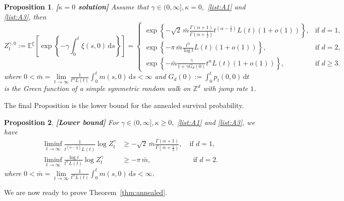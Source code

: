 \documentclass{article}[12pt]
\newtheorem{proposition}{Proposition}[section]
\theoremstyle{definition}
\newcommand{\Z}{\mathbb{Z}}
\newcommand{\E}{\mathbb{E}}
\newcommand{\1}{\mathbbm{1}}
\newcommand{\dd }{\mathrm{d} }
\begin{document}
\begin{proposition}
 \label{lm:kappa0}{\em \bf[$\kappa = 0$ solution]}
Assume that $\gamma \in (0,\infty],\kappa = 0,$ {\rm \ref{list:A1}} and {\rm \ref{list:A3}}, then
    \begin{equation}
      Z^{\gamma,0}_{t}:=  \E^\xi \left[\exp\left\{-\gamma\int_0^t \xi(s,0) \, \dd s\right\}\right] = \begin{cases}
            \exp\left\{- \sqrt{2}\, \bar{m} \frac{\Gamma(\alpha+1)}{\Gamma(\alpha+\frac{1}{2}
        )}t^{(\alpha-\frac{1}{2})}L(t)(1+o(1))\right\},& \text{if } d=1,\\
        \exp\left\{- {\pi\,\bar{m}}\frac{t^{\alpha}}{\log t}L(t)(1+o(1))\right\}, & \text{if } d=2,\\
      \exp\left\{-{\bar{m}}\frac{\gamma }{1 + \gamma G_d(0)}t^{\alpha}L(t)(1+o(1))\right\}, & \text{if } d\ge 3.
        \end{cases}
        \label{eqn:kappazerofinal}
    \end{equation}
    where  $0<\bar{m} = \lim\limits_{t\to \infty}\frac{1}{t^\alpha L(t)}\int_0^t m(s,0)\, \dd s< \infty$ and
 $G_d(0):= \int_0^t p_t(0,0)\,\dd t$ is the Green function of a simple symmetric random walk on $\Z^d$ with jump rate $1$. 
\end{proposition}
The final Proposition is the lower bound for the annealed survival probability. 
\begin{proposition}\label{prop:LB}{\em \bf[Lower bound]}
   For $\gamma \in (0,\infty],\kappa \ge 0,$ {\rm \ref{list:A1}} and {\rm\ref{list:A3}}, we have 
    \begin{equation}
    \begin{split}
       \liminf_{t\to \infty}\frac{1}{t^{(\alpha-\frac{1}{2})}L(t)} \log Z^{\gamma}_t &\ge  - \sqrt{2}\, \bar{m} \frac{\Gamma(\alpha+1)}{\Gamma(\alpha+\frac{1}{2})}, \quad \text{if } d=1,\\
       \liminf_{t\to \infty}\frac{\log t}{t^{\alpha}L(t)} \log Z^{\gamma}_t &\ge  - {\pi\,\bar{m}}, \qquad \qquad \qquad \text{if } d=2.
        \label{eqn:lowerbound}
        \end{split}
    \end{equation}
    where  $0<\bar{m} = \lim\limits_{t\to \infty}\frac{1}{t^\alpha L(t)}\int_0^t m(s,0)\, \dd s< \infty$.
\end{proposition}
We are now ready to prove Theorem~\ref{thm:annealed}.
\end{document}

